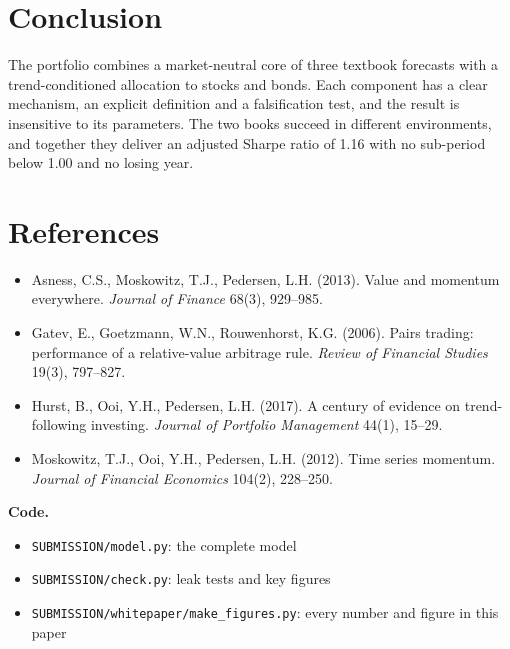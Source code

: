 \documentclass[10.5pt,a4paper]{article}
\begin{document}
\section{Conclusion}
The portfolio combines a market-neutral core of three textbook forecasts with a trend-conditioned allocation to stocks and bonds. Each component has a clear mechanism, an explicit definition and a falsification test, and the result is insensitive to its parameters. The two books succeed in different environments, and together they deliver an adjusted Sharpe ratio of 1.16 with no sub-period below 1.00 and no losing year.

\section*{References}
{\small
\begin{itemize}[leftmargin=0pt,label={},itemsep=2pt]
\item Asness, C.S., Moskowitz, T.J., Pedersen, L.H. (2013). Value and momentum everywhere. \textit{Journal of Finance} 68(3), 929--985.
\item Gatev, E., Goetzmann, W.N., Rouwenhorst, K.G. (2006). Pairs trading: performance of a relative-value arbitrage rule. \textit{Review of Financial Studies} 19(3), 797--827.
\item Hurst, B., Ooi, Y.H., Pedersen, L.H. (2017). A century of evidence on trend-following investing. \textit{Journal of Portfolio Management} 44(1), 15--29.
\item Moskowitz, T.J., Ooi, Y.H., Pedersen, L.H. (2012). Time series momentum. \textit{Journal of Financial Economics} 104(2), 228--250.
\end{itemize}

\textbf{Code.}
\begin{itemize}[leftmargin=1.2em,itemsep=1pt]
\item \texttt{SUBMISSION/model.py}: the complete model
\item \texttt{SUBMISSION/check.py}: leak tests and key figures
\item \texttt{SUBMISSION/whitepaper/make\_figures.py}: every number and figure in this paper
\end{itemize}}
\end{document}
